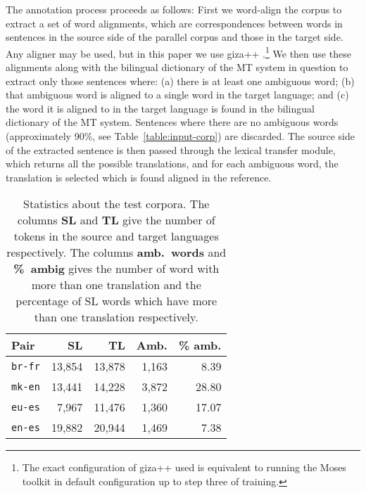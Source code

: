 \documentclass[11pt]{article}
\begin{document}
The annotation process proceeds as follows: First we word-align the
corpus to extract a set of word alignments, which are correspondences
between words in sentences in the source side of the parallel corpus
and those in the target side. Any aligner may be used, but in this
paper we use {\sc giza++} \citep{och03a}.\footnote{The exact
  configuration of {\sc giza++} used is equivalent to running the {\sc
    Moses} toolkit \citep{koehn07} in default configuration up to step
  three of training.}  We then use
these alignments along with the bilingual dictionary of the MT system
in question to extract only those sentences where: (a) there is at least
one ambiguous word; (b) that ambiguous word is aligned to a single word in
the target language; and (c) the word it is aligned to in the target
language is found in the bilingual dictionary of the MT
system. Sentences where there are no ambiguous words (approximately
90\%, see Table~\ref{table:input-corp}) are discarded. The source side
of the extracted sentence is then passed through the lexical transfer
module, which returns all the possible translations, and for each
ambiguous word, the translation is selected which is found aligned in
the reference.

  \begin{table}
  \begin{center}
   \begin{tabular}{|l|r|r|r|r|}
      \hline 
      {\bf Pair}      & {\bf SL} & {\bf TL} & {\bf Amb.} & {\bf \% amb.} \\ 
      \hline 
       \texttt{br-fr} & 13,854  & 13,878  & 1,163 & 8.39   \\
      \hline 
       \texttt{mk-en} & 13,441 & 14,228  & 3,872 & 28.80 \\
      \hline 
       \texttt{eu-es} & 7,967 & 11,476  & 1,360  & 17.07 \\
      \hline 
       \texttt{en-es} & 19,882 & 20,944  & 1,469  & 7.38 \\
      \hline 
   \end{tabular} 
  \end{center}
   \caption{Statistics about the test corpora. The columns \textbf{SL} and \textbf{TL} give the number
      of tokens in the source and target languages respectively. The columns \textbf{amb.\ words} and \textbf{\%~ambig} gives 
      the number of word with more than one translation and the percentage of SL words which have 
      more than one translation respectively.}
    \label{table:test-corp}
  \end{table}
\end{document}
